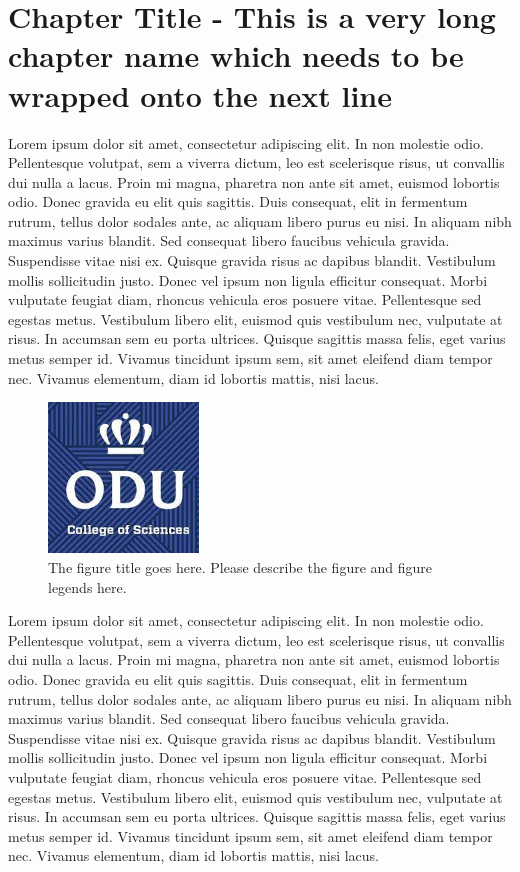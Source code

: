 \chapter{Chapter Title - This is a very long chapter name which needs to be wrapped onto the next line }

Lorem ipsum dolor sit amet, consectetur adipiscing elit. In non molestie odio. Pellentesque volutpat, sem a viverra dictum, leo est scelerisque risus, ut convallis dui nulla a lacus. Proin mi magna, pharetra non ante sit amet, euismod lobortis odio. Donec gravida eu elit quis sagittis. Duis consequat, elit in fermentum rutrum, tellus dolor sodales ante, ac aliquam libero purus eu nisi. In aliquam nibh maximus varius blandit. Sed consequat libero faucibus vehicula gravida. Suspendisse vitae nisi ex. Quisque gravida risus ac dapibus blandit. Vestibulum mollis sollicitudin justo. Donec vel ipsum non ligula efficitur consequat. Morbi vulputate feugiat diam, rhoncus vehicula eros posuere vitae. Pellentesque sed egestas metus. Vestibulum libero elit, euismod quis vestibulum nec, vulputate at risus. In accumsan sem eu porta ultrices. Quisque sagittis massa felis, eget varius metus semper id. Vivamus tincidunt ipsum sem, sit amet eleifend diam tempor nec. Vivamus elementum, diam id lobortis mattis, nisi lacus.

\begin{figure}[tbh]
  \centering
  \includegraphics[height=4cm]{Figures/cos1.jpeg}
  \caption[The figure title goes here.]{The figure title goes here. Please describe the figure and figure legends here.}
  \label{fig:cos1_1}
\end{figure}

Lorem ipsum dolor sit amet, consectetur adipiscing elit. In non molestie odio. Pellentesque volutpat, sem a viverra dictum, leo est scelerisque risus, ut convallis dui nulla a lacus. Proin mi magna, pharetra non ante sit amet, euismod lobortis odio. Donec gravida eu elit quis sagittis. Duis consequat, elit in fermentum rutrum, tellus dolor sodales ante, ac aliquam libero purus eu nisi. In aliquam nibh maximus varius blandit. Sed consequat libero faucibus vehicula gravida. Suspendisse vitae nisi ex. Quisque gravida risus ac dapibus blandit. Vestibulum mollis sollicitudin justo. Donec vel ipsum non ligula efficitur consequat. Morbi vulputate feugiat diam, rhoncus vehicula eros posuere vitae. Pellentesque sed egestas metus. Vestibulum libero elit, euismod quis vestibulum nec, vulputate at risus. In accumsan sem eu porta ultrices. Quisque sagittis massa felis, eget varius metus semper id. Vivamus tincidunt ipsum sem, sit amet eleifend diam tempor nec. Vivamus elementum, diam id lobortis mattis, nisi lacus.

